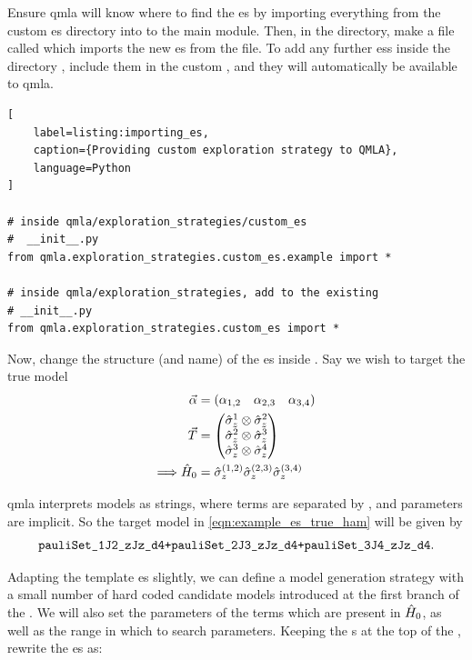 Ensure \gls{qmla} will know where to find the \gls{es} by importing everything from the custom \gls{es} 
    directory into to the main  module. 
Then, in the  directory, make a file called  which imports the new \gls{es}
    from the  file. 
To add any further \glspl{es} inside the directory , include them in the custom ,
    and they will automatically be available to \gls{qmla}.

\begin{lstlisting}[
    label=listing:importing_es,
    caption={Providing custom exploration strategy to QMLA},
    language=Python
]

# inside qmla/exploration_strategies/custom_es
#  __init__.py    
from qmla.exploration_strategies.custom_es.example import *

# inside qmla/exploration_strategies, add to the existing
# __init__.py 
from qmla.exploration_strategies.custom_es import *

\end{lstlisting}

Now, change the structure (and name) of the \gls{es} inside . 
Say we wish to target the \gls{true model} 
\begin{equation}
    \label{eqn:example_es_true_ham}
    \begin{split}
        \vec{\alpha} &= \begin{matrix}( \alpha_{1,2} & \alpha_{2,3} & \alpha_{3,4})\end{matrix} \\
        { \vec{T} } &= \left(\begin{matrix} \hat{\sigma}_{z}^1 \otimes \hat{\sigma}_{z}^2 \\ \hat{\sigma}_{z}^2 \otimes \hat{\sigma}_{z}^3  \\ \hat{\sigma}_{z}^3 \otimes \hat{\sigma}_{z}^4 \end{matrix}\right) \\
        \Longrightarrow \hat{H}_0 &= \hat{\sigma}_{z}^{(1,2)} \hat{\sigma}_{z}^{(2,3)} \hat{\sigma}_{z}^{(3,4)} \\
    \end{split}
\end{equation}

\gls{qmla} interprets models as strings, where terms are separated by \ttt{+}, and parameters are implicit. 
So the target model in \cref{eqn:example_es_true_ham} will be given by 
$$ \texttt{pauliSet\_1J2\_zJz\_d4+pauliSet\_2J3\_zJz\_d4+pauliSet\_3J4\_zJz\_d4}. $$

Adapting the template \gls{es} slightly, we can define a model generation strategy with a small number of hard coded 
    candidate models introduced at the first branch of the . 
We will also set the parameters of the terms which are present in $\hat{H}_0$, as well as the range in which to search parameters.
Keeping the s at the top of the , rewrite the \gls{es} as: 

